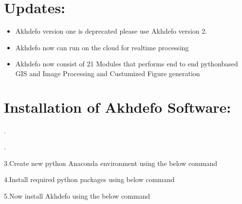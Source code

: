 \documentclass[letterpaper,10pt]{sphinxmanual}
\begin{document}
\chapter{Updates:}
\label{\detokenize{README:updates}}\begin{itemize}
\item {} 
\sphinxAtStartPar
Akhdefo version one is deprecated please use Akhdefo version 2.

\item {} 
\sphinxAtStartPar
Akhdefo now can run on the cloud for real\sphinxhyphen{}time processing

\item {} 
\sphinxAtStartPar
Akhdefo now consist of 21 Modules that performs end to end python\sphinxhyphen{}based GIS and Image Processing and Custumized Figure generation

\end{itemize}


\chapter{Installation of Akhdefo Software:}
\label{\detokenize{README:installation-of-akhdefo-software}}
.

.

\sphinxAtStartPar
3.Create new python Anaconda environment using the below command

\begin{sphinxVerbatim}[commandchars=\\\{\}]
    

\end{sphinxVerbatim}

\sphinxAtStartPar
4.Install required python packages using below command

\begin{sphinxVerbatim}[commandchars=\\\{\}]
   
\end{sphinxVerbatim}

\sphinxAtStartPar
5.Now install Akhdefo using the below command

\begin{sphinxVerbatim}[commandchars=\\\{\}]
  
\end{sphinxVerbatim}
\end{document}
